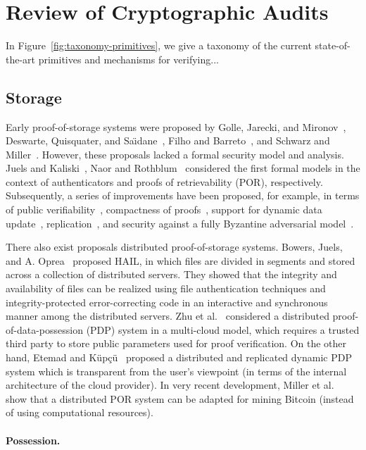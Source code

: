 \section{Review of Cryptographic Audits} \label{sect:techniques}

In Figure~\ref{fig:taxonomy-primitives}, we give a taxonomy of the current state-of-the-art primitives and mechanisms for verifying...

\subsection{Storage}

Early proof-of-storage systems were proposed by Golle, Jarecki, and Mironov~\cite{GJM02}, Deswarte, Quisquater, and Sa\"{\i}dane~\cite{DQS03}, Filho and Barreto~\cite{FB06}, and Schwarz and Miller~\cite{SM06}.
However, these proposals lacked a formal security model and analysis.
Juels and Kaliski~\cite{JK07}, Naor and Rothblum~\cite{NR09} considered the first formal models in the context of authenticators and proofs of retrievability (POR), respectively.
Subsequently, a series of improvements have been proposed, for example, in terms of public verifiability~\cite{AKK09,ABC+11}, compactness of proofs~\cite{SW13}, support for dynamic data update~\cite{ADM+08,EKP+09,WWL+09,SDJ+12,CKW13,SSP13}, replication~\cite{CKB+08}, and security against a fully Byzantine adversarial model~\cite{BJO09a}.

There also exist proposals distributed proof-of-storage systems.
Bowers, Juels, and A. Oprea~\cite{BJO09b} proposed HAIL, in which files are divided in segments and stored across a collection of distributed servers.
They showed that the integrity and availability of files can be realized using file authentication techniques and integrity-protected error-correcting code in an interactive and synchronous manner among the distributed servers.
Zhu et al.~\cite{ZHA+12} considered a distributed proof-of-data-possession (PDP) system in a multi-cloud model, which requires a trusted third party to store public parameters used for proof verification.
On the other hand, Etemad and K{\"u}p\c{c}{\"u}~\cite{EK13} proposed a distributed and replicated dynamic PDP system which is transparent from the user's viewpoint (in terms of the internal architecture of the cloud provider).
In very recent development, Miller et al.~\cite{MJS+14} show that a distributed POR system can be adapted for mining Bitcoin (instead of using computational resources).

\paragraph{Possession.}

